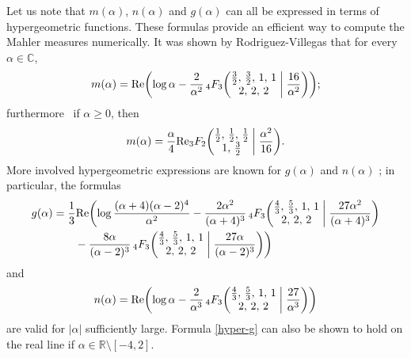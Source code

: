 \documentclass[12pt,reqno]{amsart}
\theoremstyle{remark}
\begin{document}
Let us note that $m(\alpha)$, $n(\alpha)$ and $g(\alpha)$ can all
be expressed in terms of hypergeometric functions. These formulas
provide an efficient way to compute the Mahler measures
numerically. It was shown by Rodriguez-Villegas \cite{RV} that for
every $\alpha\in\mathbb C$,
\begin{equation}
m(\alpha)={\operatorname{Re}}\biggl(\log\alpha
-\frac{2}{\alpha^2}\,{}_4F_3\biggl(\begin{matrix} \frac32, \, \frac32, \, 1, \, 1 \\
2, \, 2, \, 2 \end{matrix}\biggm| \frac{16}{\alpha^2} \biggr) \biggr);
\label{hyper-m1}
\end{equation}
furthermore~\cite{KO} if $\alpha\ge 0$, then
\begin{equation}
m(\alpha)=\frac\alpha4{\operatorname{Re}}{}_3F_2\biggl(\begin{matrix} \frac12, \, \frac12, \, \frac12 \\
1, \, \frac{3}{2}\end{matrix}\biggm| \frac{\alpha^2}{16} \biggr).
\label{hyper-m2}
\end{equation}
More involved hypergeometric expressions are known for $g(\alpha)$ and $n(\alpha)$ \cite[Theorem~3.1]{Rgsubmit};
in particular, the formulas
\begin{align}
g(\alpha)
&=\frac13{\operatorname{Re}}\biggl(\log\frac{(\alpha+4)(\alpha-2)^4}{\alpha^2}
-\frac{2\alpha^2}{(\alpha+4)^3}\,{}_4F_3\biggl(\begin{matrix} \frac43, \, \frac53, \, 1, \, 1 \\
2, \, 2, \, 2 \end{matrix}\biggm| \frac{27\alpha^2}{(\alpha+4)^3} \biggr)
\notag\\ &\qquad
-\frac{8\alpha}{(\alpha-2)^3}\,{}_4F_3\biggl(\begin{matrix} \frac43, \, \frac53, \, 1, \, 1 \\
2, \, 2, \, 2 \end{matrix}\biggm| \frac{27\alpha}{(\alpha-2)^3} \biggr) \biggr)
\label{hyper-g}
\end{align}
and
\begin{equation}
n(\alpha)
={\operatorname{Re}}\biggl(\log\alpha
-\frac{2}{\alpha^3}\,{}_4F_3\biggl(\begin{matrix} \frac43, \, \frac53, \, 1, \, 1 \\
2, \, 2, \, 2 \end{matrix}\biggm| \frac{27}{\alpha^3} \biggr) \biggr)
\label{hyper-n}
\end{equation}
are valid for $|\alpha|$ sufficiently large.  Formula
\eqref{hyper-g} can also be shown to hold on the real line if
$\alpha\in\mathbb R\setminus[-4,2]$.
\end{document}
